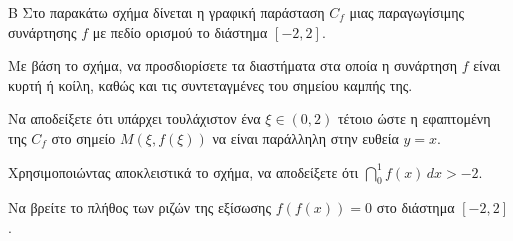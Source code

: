
\begin{thema}{Β}
Στο παρακάτω σχήμα δίνεται η γραφική παράσταση $C_f$ μιας παραγωγίσιμης συνάρτησης $f$ με πεδίο ορισμού το διάστημα $[-2, 2]$.

\begin{center}
\end{center}

\begin{erwthma}
  \item Με βάση το σχήμα, να προσδιορίσετε τα διαστήματα στα οποία η συνάρτηση $f$ είναι κυρτή ή κοίλη, καθώς και τις συντεταγμένες του σημείου καμπής της.
  \item Να αποδείξετε ότι υπάρχει τουλάχιστον ένα $\xi \in (0, 2)$ τέτοιο ώστε η εφαπτομένη της $C_f$ στο σημείο $M(\xi, f(\xi))$ να είναι παράλληλη στην ευθεία $y = x$.
  \item Χρησιμοποιώντας αποκλειστικά το σχήμα, να αποδείξετε ότι $\dint_{0}^{1} f(x) \, dx > -2$.
  \item Να βρείτε το πλήθος των ριζών της εξίσωσης $f(f(x)) = 0$ στο διάστημα $[-2, 2]$.
\end{erwthma}
\end{thema}


